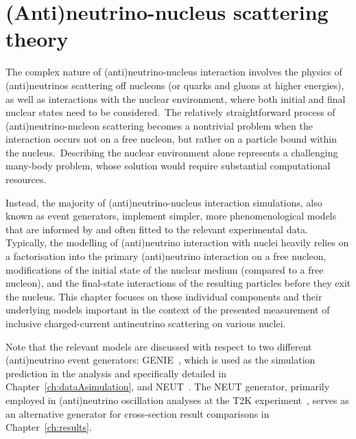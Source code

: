 \chapter{(Anti)neutrino-nucleus scattering theory}

\label{ch:theory}
The complex nature of (anti)neutrino-nucleus interaction involves the physics of (anti)neu\-trinos scattering off nucleons (or quarks and gluons at higher energies), as well as interactions with the nuclear environment, where both initial and final nuclear states need to be considered.~The relatively straightforward process of (anti)neutrino-nucleon scattering becomes a nontrivial problem when the interaction occurs not on a free nucleon, but rather on a particle bound within the nucleus.~Describing the nuclear environment alone represents a challenging many-body problem, whose solution would require substantial computational resources. 

Instead, the majority of (anti)neutrino-nucleus interaction simulations, also known as event generators, implement simpler, more phenomenological models that are informed by and often fitted to the relevant experimental data. Typically, the modelling of (anti)neutrino interaction with nuclei heavily relies on a factorisation into the primary (anti)neutrino interaction on a free nucleon, modifications of the initial state of the nuclear medium (compared to a free nucleon), and the final-state interactions of the resulting particles before they exit the nucleus. This chapter focuses on these individual components and their underlying models important in the context of the presented measurement of inclusive charged-current antineutrino scattering on various nuclei. 

Note that the relevant models are discussed with respect to two different (anti)neutrino event generators: GENIE~\cite{genie_ANDREOPOULOS201087, genie_andreopoulos2015}, which is used as the simulation prediction in the analysis and specifically detailed in Chapter~\ref{ch:dataAsimulation}, and NEUT~\cite{Hayato:2009zz, HayatoPickering2021}. The NEUT generator, primarily employed in (anti)neutrino oscillation analyses at the T2K experiment~\cite{t2k_ABE2011106}, serves as an alternative generator for cross-section result comparisons in Chapter~\ref{ch:results}.



